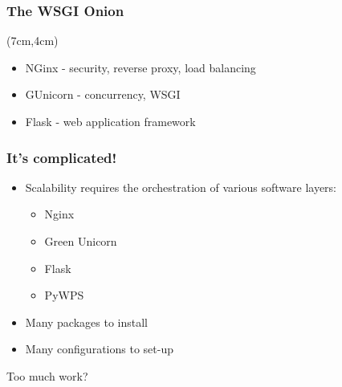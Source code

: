 \documentclass{beamer}
\begin{document}
\begin{frame}
\frametitle<presentation>{The WSGI Onion}


\begin{textblock*}{5cm}(7cm,4cm)
\begin{itemize}
  \item NGinx - security, reverse proxy, load balancing
  \item GUnicorn - concurrency, WSGI 
  \item Flask - web application framework
\end{itemize}
\end{textblock*}
\end{frame}


\begin{frame}
\frametitle<presentation>{It's complicated!}

\begin{itemize}
  \item Scalability requires the orchestration of various software layers:
   \begin{itemize}
	  \item Nginx
	  \item Green Unicorn
	  \item Flask
	  \item PyWPS 
	\end{itemize}
  \item Many packages to install
  \item Many configurations to set-up
\end{itemize}

\vspace{0.4cm}
\centering
\Large{Too much work?}

\end{frame}
\end{document}
